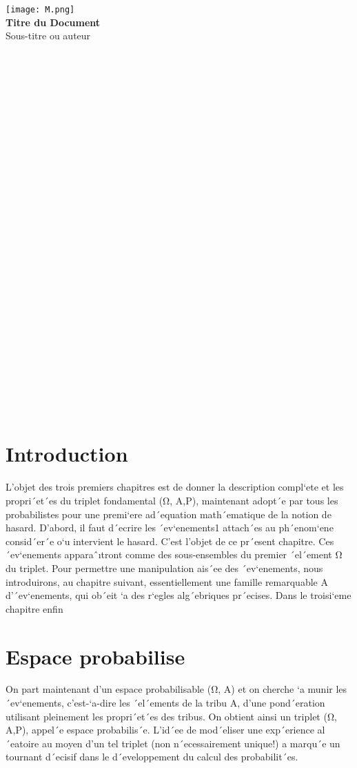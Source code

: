 \documentclass[a4paper,12pt]{article} %
\begin{document}
\begin{titlepage}
    \centering
    \texttt{[image: M.png]} \\ %
    \vspace{1 cm}
    \Huge \textbf{Titre du Document} \\
    \vspace{0.5cm}
    \Large Sous-titre ou auteur \\
    \vspace{1cm}
\end{titlepage}\\
\\\\
\\\\
\\
\\\\
\\\\\\\\\\
\\\\\\\


\\\\\
\\
\\\\\\\\\\\
\section{Introduction}
L’objet des trois premiers chapitres est de donner la description compl`ete
et les propri´et´es du triplet fondamental (Ω, A,P), maintenant adopt´e par tous
les probabilistes pour une premi`ere ad´equation math´ematique de la notion
de hasard. D’abord, il faut d´ecrire les ´ev`enements1 attach´es au ph´enom`ene
consid´er´e o`u intervient le hasard. C’est l’objet de ce pr´esent chapitre. Ces
´ev`enements apparaˆıtront comme des sous-ensembles du premier ´el´ement Ω
du triplet. Pour permettre une manipulation ais´ee des ´ev`enements, nous
introduirons, au chapitre suivant, essentiellement une famille remarquable A
d’´ev`enements, qui ob´eit `a des r`egles alg´ebriques pr´ecises. Dans le troisi`eme
chapitre enfin
\section{Espace probabilise }
On part maintenant d’un espace probabilisable (Ω, A) et on cherche
`a munir les ´ev`enements, c’est-`a-dire les ´el´ements de la tribu A, d’une
pond´eration utilisant pleinement les propri´et´es des tribus. On obtient ainsi un
triplet (Ω, A,P), appel´e espace probabilis´e. L’id´ee de mod´eliser une exp´erience
al´eatoire au moyen d’un tel triplet (non n´ecessairement unique!) a marqu´e
un tournant d´ecisif dans le d´eveloppement du calcul des probabilit´es.
\end{document}

